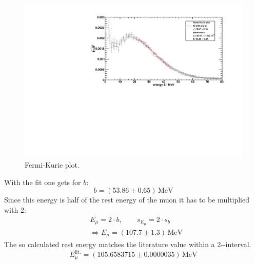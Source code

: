 \begin{figure}[H]
\begin{center}
  \includegraphics[width=\textwidth]{../img/betaspectrum_FermiKurie_fit.pdf}
  \caption{Fermi-Kurie plot.}
  \label{img:beta:fermikuriefit}
\end{center}
\end{figure}
With the fit one gets for $b$:
\begin{equation}
    b = (53.86 \pm 0.65)\,\text{MeV}
\end{equation}
Since this energy is half of the rest energy of the muon it has to be multiplied with 2:
\begin{equation}
\begin{split}
    & E_\mu = 2 \cdot b, \qquad s_{E_\mu} = 2 \cdot s_b \\
    & \Rightarrow E_\mu = (107.7 \pm 1.3)\,\text{MeV}
    \end{split}
\end{equation}
The so calculated rest energy matches the literature value within a 2-\textsigma-interval.
\begin{equation}
    E_\mu^{\text{lit.}} = (105.6583715 \pm 0.0000035)\,\text{MeV}
\end{equation}


